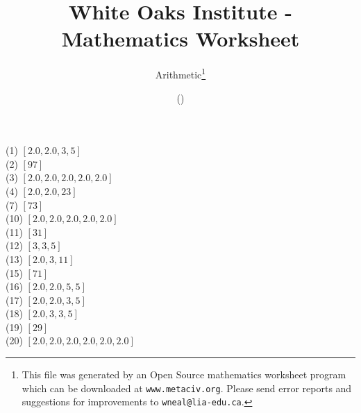 \documentclass[letter]{article}
\begin{document}
\title{White Oaks Institute - Mathematics Worksheet}
\author{Arithmetic\thanks{This file was generated by an \textsf{Open Source} mathematics worksheet program which can be downloaded at \texttt{www.metaciv.org}. Please send error reports and suggestions for improvements to \texttt{wneal@lia-edu.ca}.}}
\date{\XCfileversion{} (\XCfiledate)}
\maketitle
\setlength{\parskip}{12mm plus 4mm minus 4mm}\setlength{\parindent}{0cm}\begin{multicols}{2}(1) $[2.0, 2.0, 3, 5]$\\(2) $[97]$\\(3) $[2.0, 2.0, 2.0, 2.0, 2.0]$\\(4) $[2.0, 2.0, 23]$\\(7) $[73]$\\(10) $[2.0, 2.0, 2.0, 2.0, 2.0]$\\(11) $[31]$\\(12) $[3, 3, 5]$\\(13) $[2.0, 3, 11]$\\(15) $[71]$\\(16) $[2.0, 2.0, 5, 5]$\\(17) $[2.0, 2.0, 3, 5]$\\(18) $[2.0, 3, 3, 5]$\\(19) $[29]$\\(20) $[2.0, 2.0, 2.0, 2.0, 2.0, 2.0]$\\\end{multicols}
\end{document}

